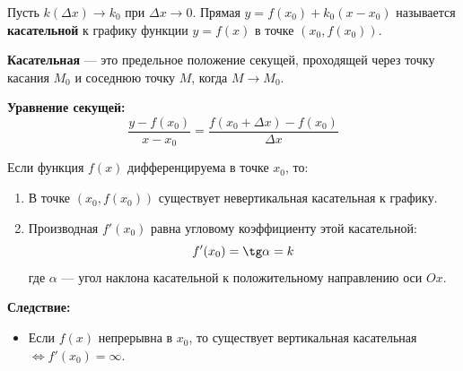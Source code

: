 \begin{center}
\end{center}

\begin{tcolorbox}[title=Определение касательной]
    Пусть $k(\Delta x) \to k_0$ при $\Delta x \to 0$.
    Прямая $y = f(x_0) + k_0(x-x_0)$ называется \textbf{касательной} к графику функции $y=f(x)$ в точке $(x_0, f(x_0))$.
\end{tcolorbox}

\begin{tcolorbox}[title=Определение]
    \textbf{Касательная} — это предельное положение секущей, проходящей через точку касания $M_0$ и соседнюю точку $M$, когда $M \to M_0$.
\end{tcolorbox}

\textbf{Уравнение секущей:}
\[ \frac{y - f(x_0)}{x - x_0} = \frac{f(x_0+\Delta x) - f(x_0)}{\Delta x} \]

\begin{tcolorbox}[title=Геометрический смысл производной]
    Если функция $f(x)$ дифференцируема в точке $x_0$, то:
    \begin{enumerate}
        \item В точке $(x_0, f(x_0))$ существует невертикальная касательная к графику.
        \item Производная $f'(x_0)$ равна угловому коэффициенту этой касательной:
        \[ f'(x_0) = \tg \alpha = k \]
        где $\alpha$ — угол наклона касательной к положительному направлению оси $Ox$.
    \end{enumerate}
    \textbf{Следствие:}
    \begin{itemize}
        \item Если $f(x)$ непрерывна в $x_0$, то существует вертикальная касательная $\iff f'(x_0) = \infty$.
    \end{itemize}
\end{tcolorbox}

